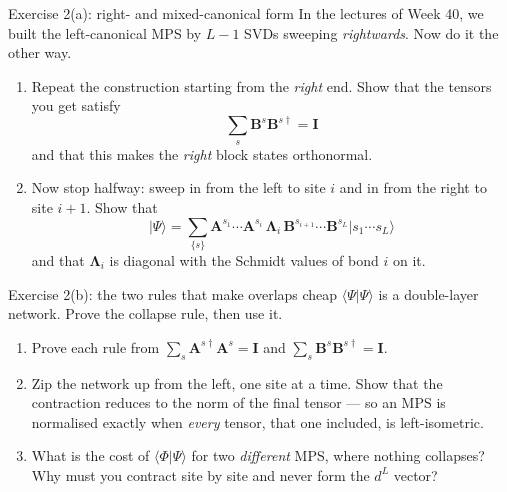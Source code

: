 \documentclass[aspectratio=169,10pt]{beamer}
\newcommand{\ket}[1]{\vert #1\rangle}
\newcommand{\braket}[2]{\langle #1\vert #2\rangle}
\newcommand{\bmat}[1]{\bm{#1}}
\newcommand{\Amat}[1]{\bm{A}^{#1}}
\newcommand{\Bmat}[1]{\bm{B}^{#1}}
\begin{document}
\begin{frame}{Exercise 2(a): right- and mixed-canonical form}
  In the lectures of Week 40, we built the left-canonical MPS by $L-1$ SVDs sweeping \emph{rightwards}. Now do it the other way.
  \begin{enumerate}
    \item Repeat the construction starting from the \emph{right} end. Show that the tensors you get satisfy
      \[\sum_s\Bmat s\Bmat{s\dagger}=\bmat I\]
      and that this makes the \emph{right} block states orthonormal.
    \item Now stop halfway: sweep in from the left to site $i$ and in from the right to site $i+1$. Show that
      \[\ket\Psi=\sum_{\{s\}}\Amat{s_1}\cdots\Amat{s_i}\,\bm\Lambda_i\,\Bmat{s_{i+1}}\cdots\Bmat{s_L}\ket{s_1\cdots s_L}\]
      and that $\bm\Lambda_i$ is diagonal with the Schmidt values of bond $i$ on it.
  \end{enumerate}
\end{frame}

\begin{frame}{Exercise 2(b): the two rules that make overlaps cheap}
  $\braket\Psi\Psi$ is a double-layer network. Prove the collapse rule, then use it.
  \begin{center}
  \end{center}
  \begin{enumerate}
    \item Prove each rule from $\sum_s\Amat{s\dagger}\Amat s=\bmat I$ and $\sum_s\Bmat s\Bmat{s\dagger}=\bmat I$.
    \item Zip the network up from the left, one site at a time. Show that the contraction reduces to the norm of the
          final tensor --- so an MPS is normalised exactly when \emph{every} tensor, that one included, is left-isometric.
    \item What is the cost of $\braket\Phi\Psi$ for two \emph{different} MPS, where nothing collapses? Why must you contract site by site and never form the $d^L$ vector?
  \end{enumerate}
\end{frame}
\end{document}

